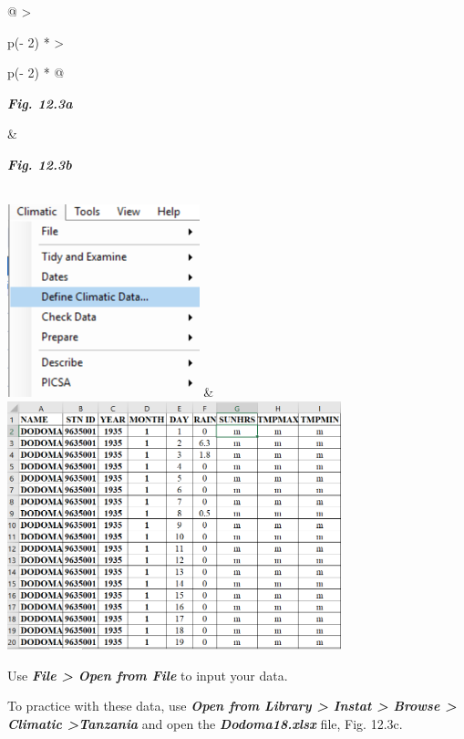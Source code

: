 \documentclass[
  letterpaper,
  DIV=11,
  numbers=noendperiod]{scrreprt}
\begin{document}
\begin{longtable}[]{@{}
  >{\raggedright\arraybackslash}p{(\columnwidth - 2\tabcolsep) * }
  >{\raggedright\arraybackslash}p{(\columnwidth - 2\tabcolsep) * }@{}}
\toprule\noalign{}
\begin{minipage}[b]{\linewidth}\raggedright
\textbf{\emph{Fig. 12.3a}}
\end{minipage} & \begin{minipage}[b]{\linewidth}\raggedright
\textbf{\emph{Fig. 12.3b}}
\end{minipage} \\
\midrule\noalign{}
\endhead
\bottomrule\noalign{}
\endlastfoot
\includegraphics[width=2.19456in,height=2.2015in]{figures/Fig12.3a.png}
&
\includegraphics[width=3.81497in,height=2.83534in]{figures/Fig12.3b.png} \\
\end{longtable}

Use \textbf{\emph{File \textgreater{} Open from File}} to input your
data.

To practice with these data, use \textbf{\emph{Open from Library
\textgreater{} Instat \textgreater{} Browse \textgreater{} Climatic
\textgreater Tanzania}} and open the \textbf{\emph{Dodoma18.xlsx}} file,
Fig. 12.3c.
\end{document}
